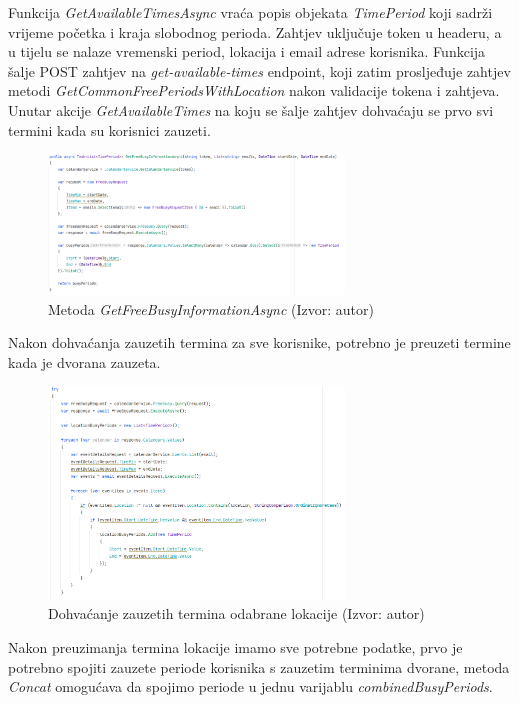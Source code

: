 \documentclass{foi}
\begin{document}
Funkcija \textit{GetAvailableTimesAsync} vraća popis objekata \textit{TimePeriod} koji sadrži vrijeme početka i kraja slobodnog perioda. Zahtjev uključuje token u headeru, a u tijelu se nalaze vremenski period, lokacija i email adrese korisnika. Funkcija šalje POST zahtjev na \textit{get-available-times} endpoint, koji zatim prosljeđuje zahtjev metodi \textit{GetCommonFreePeriodsWithLocation} nakon validacije tokena i zahtjeva.
Unutar akcije \textit{GetAvailableTimes} na koju se šalje zahtjev dohvaćaju se prvo svi termini kada su korisnici zauzeti.
\begin{figure}[H]
    \centering
    \includegraphics[width=0.7\textwidth]{slike/getfreebuisy.png}
    \caption{Metoda \textit{GetFreeBusyInformationAsync} (Izvor: autor)}
    \label{fig:GetFreeBusyInformationAsync}
\end{figure}
Nakon dohvaćanja zauzetih termina za sve korisnike, potrebno je preuzeti termine kada je dvorana zauzeta.
\begin{figure}[H]
    \centering
    \includegraphics[width=0.7\textwidth]{slike/GetBuisyLocation.png}
    \caption{Dohvaćanje zauzetih termina odabrane lokacije (Izvor: autor)}
    \label{fig:GetBuisyLocation}
\end{figure}
Nakon preuzimanja termina lokacije imamo sve potrebne podatke, prvo je potrebno spojiti zauzete periode korisnika s zauzetim terminima dvorane, metoda \textit{Concat} omogućava da spojimo periode u jednu varijablu \textit{combinedBusyPeriods}.
\end{document}
